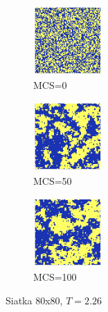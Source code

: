 \documentclass[12pt]{article}
\begin{document}
\begin{figure}[H]
  \centering

  \begin{subfigure}[b]{0.3\linewidth}
    \centering
    \includegraphics[width=100px, height=100px]{../data/snaps/snap80_temp2.26_moment1.png}
    \caption{MCS=0}
    \label{fig:image1}
  \end{subfigure}
  \hfill
  \begin{subfigure}[b]{0.3\linewidth}
    \centering
    \includegraphics[width=100px, height=100px]{../data/snaps/snap80_temp2.26_moment50.png}
    \caption{MCS=50}
    \label{fig:image2}
  \end{subfigure}
  \hfill
  \begin{subfigure}[b]{0.3\linewidth}
    \centering
    \includegraphics[width=100px, height=100px]{../data/snaps/snap80_temp2.26_moment100.png}
    \caption{MCS=100}
    \label{fig:image3}
  \end{subfigure}

  \caption{Siatka $80$x$80$, $T=2.26$}
  \label{fig:series}
\end{figure}
\end{document}
